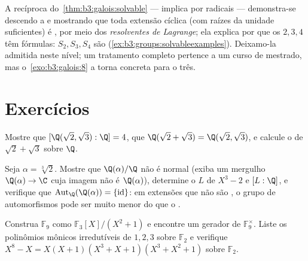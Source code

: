 \begin{remark}\label{rem:b3:galois:converse}
A recíproca do~\cref{thm:b3:galois:solvable} ---   implica
 por radicais --- demonstra-se descendo a  e
mostrando que toda extensão cíclica (com raízes da unidade
suficientes) é , por meio dos \emph{resolventes de Lagrange};
ela explica por que os  $2, 3, 4$ têm fórmulas: $S_2, S_3, S_4$ são 
(\cref{ex:b3:groups:solvableexamples}). Deixamo-la admitida neste nível; um tratamento
completo pertence a um curso de mestrado, mas o~\cref{exo:b3:galois:8} a torna
concreta para o  três.
\end{remark}

\section{Exercícios}

\begin{exercise}[$\star$]\label{exo:b3:galois:1}
Mostre que $[\Q(\sqrt2, \sqrt3):\Q] = 4$, que $\Q(\sqrt2 + \sqrt3) =
\Q(\sqrt2, \sqrt3)$, e calcule o  de $\sqrt2 + \sqrt3$
sobre $\Q$.
\end{exercise}

\begin{exercise}[$\star$]\label{exo:b3:galois:2}
Seja $\alpha = \sqrt[3]2$. Mostre que $\Q(\alpha)/\Q$ não é normal (exiba um mergulho $\Q(\alpha) \to \C$
cuja imagem não é $\Q(\alpha)$), determine o  $L$ de
$X^3 -
2$ e $[L:\Q]$, e verifique que $\operatorname{Aut}_\Q(\Q(\alpha)) =
\{\mathrm{id}\}$: em extensões que não são
, o grupo de automorfismos pode ser muito menor do que o .
\end{exercise}

\begin{exercise}[$\star$]\label{exo:b3:galois:3}
Construa $\mathbb F_9$ como $\mathbb F_3[X]/(X^2+1)$ e encontre um gerador de $\mathbb F_9^\times$. Liste os
polinômios mônicos irredutíveis de  $1, 2, 3$ sobre $\mathbb F_2$ e verifique
$X^8 - X = X(X+1)(X^3+X+1)(X^3+X^2+1)$ sobre $\mathbb F_2$.
\end{exercise}

